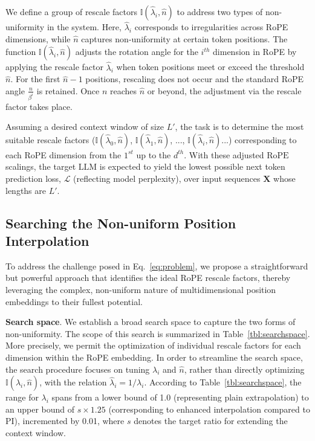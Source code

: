 We define a group of rescale factors $\mathbb{I}(\hat{\lambda}_{i},\hat{n})$ to address two types of non-uniformity in the system. Here, $\hat{\lambda}_{i}$ corresponds to irregularities across RoPE dimensions, while $\hat{n}$ captures non-uniformity at certain token positions. The function $\mathbb{I}(\hat{\lambda}_{i},\hat{n})$ adjusts the rotation angle for the $i^{th}$ dimension in RoPE by applying the rescale factor $\hat{\lambda}_{i}$ when token positions meet or exceed the threshold $\hat{n}$. For the first $\hat{n}-1$ positions, rescaling does not occur and the standard RoPE angle $\frac{n}{\beta^i}$ is retained. Once $n$ reaches $\hat{n}$ or beyond, the adjustment via the rescale factor takes place.

Assuming a desired context window of size $L'$, the task is to determine the most suitable rescale factors ($\mathbb{I}(\hat{\lambda}_{0},\hat{n})$, $\mathbb{I}(\hat{\lambda}_{1},\hat{n})$, ..., $\mathbb{I}(\hat{\lambda}_{i},\hat{n})$...) corresponding to each RoPE dimension from the $1^{st}$ up to the $d^{th}$. With these adjusted $\text{RoPE}$ scalings, the target $\text{LLM}$ is expected to yield the lowest possible next token prediction loss, $\mathcal{L}$ (reflecting model perplexity), over input sequences $\mathbf{X}$ whose lengths are $L'$.

\subsection{Searching the Non-uniform Position Interpolation}

To address the challenge posed in Eq.~\ref{eq:problem}, we propose a straightforward but powerful approach that identifies the ideal RoPE rescale factors, thereby leveraging the complex, non-uniform nature of multidimensional position embeddings to their fullest potential.

\textbf{Search space}. We establish a broad search space to capture the two forms of non-uniformity. The scope of this search is summarized in Table~\ref{tbl:searchspace}. More precisely, we permit the optimization of individual rescale factors for each dimension within the RoPE embedding. In order to streamline the search space, the search procedure focuses on tuning $\lambda_i$ and $\hat{n}$, rather than directly optimizing $\mathbb{I}(\hat{\lambda}_{i},\hat{n})$, with the relation $\hat{\lambda}_{i}=1/\lambda_i$. According to Table~\ref{tbl:searchspace}, the range for $\lambda_i$ spans from a lower bound of 1.0 (representing plain extrapolation) to an upper bound of $s\times1.25$ (corresponding to enhanced interpolation compared to PI), incremented by 0.01, where $s$ denotes the target ratio for extending the context window.

